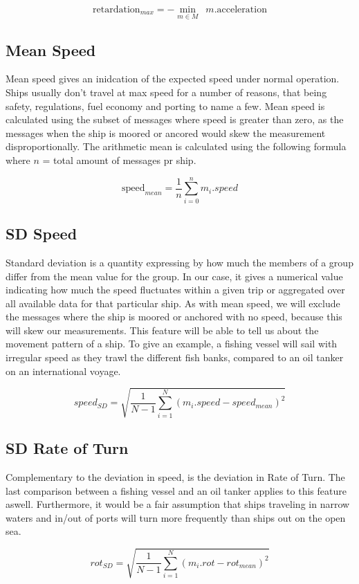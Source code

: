 $$
	\mathrm{retardation}_{max} = - \min_{m \in M}\;\:{m.\mathrm{acceleration}}
$$

\subsection{Mean Speed}
Mean speed gives an inidcation of the expected speed under normal operation. Ships usually don't travel at max speed for a number of reasons, that being safety, regulations, fuel economy and porting to name a few. Mean speed is calculated using the subset of messages where speed is greater than zero, as the messages when the ship is moored or ancored would skew the measurement disproportionally. The arithmetic mean is calculated using the following formula where $n$ = total amount of messages pr ship.

$$
	\mathrm{speed}_{mean} = \dfrac{1}{n}\sum_{i=0}^{n}{m_i.speed}
$$

\subsection{SD Speed}
Standard deviation is a quantity expressing by how much the members of a group differ from the mean value for the group. In our case, it gives a numerical value indicating how much the speed fluctuates within a given trip or aggregated over all available data for that particular ship. As with mean speed, we will exclude the messages where the ship is moored or anchored with no speed, because this will skew our measurements. This feature will be able to tell us about the movement pattern of a ship. To give an example, a fishing vessel will sail with irregular speed as they trawl the different fish banks, compared to an oil tanker on an international voyage.

$$
	speed_{SD} = \sqrt{\dfrac{1}{N-1}\sum_{i=1}^N(m_i.speed - speed_{mean})^2 }
$$


\subsection{SD Rate of Turn}
Complementary to the deviation in speed, is the deviation in Rate of Turn. The last comparison between a fishing vessel and an oil tanker applies to this feature aswell. Furthermore, it would be a fair assumption that ships traveling in narrow waters and in/out of ports will turn more frequently than ships out on the open sea.

$$
	rot_{SD} = \sqrt{\dfrac{1}{N-1}\sum_{i=1}^N(m_i.rot - rot_{mean})^2 }
$$

